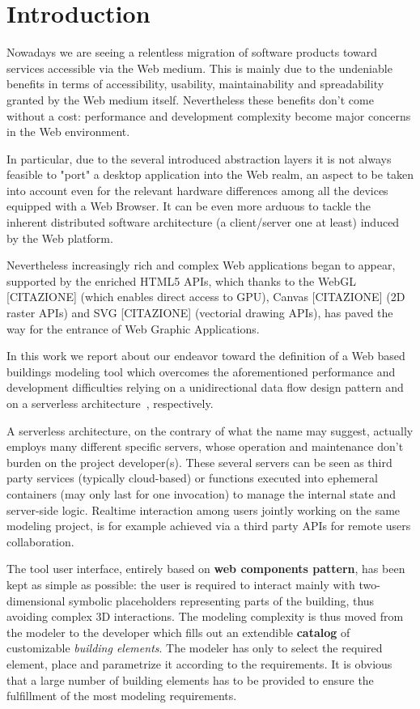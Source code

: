 \section{Introduction}

Nowadays we are seeing a relentless migration of software products toward services accessible via the Web medium. This is mainly due to the undeniable benefits in terms of accessibility, usability, maintainability and spreadability granted by the Web medium itself. Nevertheless these benefits don't come without a cost: performance  and development complexity become major concerns in the Web environment. 

In particular, due to the several introduced abstraction layers it is not always feasible to "port" a desktop application into the Web realm, an aspect to be taken into account even for the relevant hardware differences among all the devices equipped with a Web Browser. It can be even more arduous to tackle the inherent distributed software architecture (a client/server one at least) induced by the Web platform.

Nevertheless increasingly rich and complex Web applications began to appear, supported by the enriched HTML5 APIs, which thanks to the WebGL [CITAZIONE] (which enables direct access to GPU), Canvas [CITAZIONE] (2D raster APIs) and SVG [CITAZIONE] (vectorial drawing APIs), has paved the way for the entrance of Web Graphic Applications.

In this work we report about our endeavor toward the definition of a Web based buildings modeling tool which overcomes the aforementioned performance and development difficulties relying on a unidirectional data flow design pattern and on a serverless architecture~\cite{Roberts}, respectively.

A serverless architecture, on the contrary of what the name may suggest, actually employs many different specific servers, whose operation and maintenance don't burden on the project developer(s). These several servers can be seen as third party services (typically cloud-based) or functions executed into ephemeral containers (may only last for one invocation) to manage the internal state and server-side logic. Realtime interaction among users jointly working on the same modeling project, is for example achieved via a third party APIs for remote users collaboration.

The tool user interface, entirely based on \textbf{web components pattern},  has been kept as simple as possible: the user is required to interact mainly with two-dimensional symbolic placeholders representing parts of the building, thus avoiding complex 3D interactions. 
The modeling complexity is thus moved from the modeler to the developer which fills out an extendible \textbf{catalog} of customizable \textit{building elements}. The modeler has only to select the required element, place and parametrize it according to the requirements. It is obvious that a large number of building elements has to be provided to ensure the fulfillment of the most modeling requirements.

